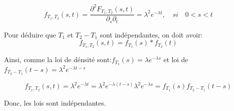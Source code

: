 \documentclass[a4paper]{article}
\begin{document}
 \begin{equation*}
 f_{T_1,T_2}(s,t)                                                               =
 \frac{ \partial^2F_{T_1,T_2}(s,t)}{\partial_{s}\partial_{t}}=\lambda^2e^{-\lambda t}, \quad si \quad
 0<s<t
 \end{equation*}


Pour déduire que $T_1$ et $T_2-T_1$ sont indépendantes, on doit avoir:
 \begin{equation*}
 f_{T_1,T_2}(s,t)=f_{T_1}(s)*f_{T_2}(t)
 \end{equation*}

Ainsi, comme la loi de dénsité sont:$f_{T_1}(s)=\lambda e^{-\lambda s}$ et loi de $f_{T_2-T_1}(t-s)=\lambda^{2}e^{-\lambda t-s}$

\begin{equation}
 f_{T_1,T_2}(s,t)=\lambda^2e^{-\lambda t}=\lambda^2e^{-\lambda (t-s)}\lambda^2e^{-\lambda s}=f_{T_1}(s)f_{T_2-T_1}(t-s)
\end{equation}

Donc, les lois sont indépendantes.


\end{document}
